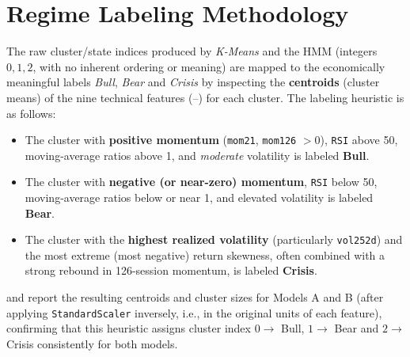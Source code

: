 \section{Regime Labeling Methodology}
\label{sec:meth-labeling}

The raw cluster/state indices produced by \textit{K-Means} and the HMM
(integers $0,1,2$, with no inherent ordering or meaning) are mapped to the
economically meaningful labels \emph{Bull}, \emph{Bear} and
\emph{Crisis} by inspecting the \textbf{centroids} (cluster means) of the
nine technical features (--) for each
cluster. The labeling heuristic is as follows:

\begin{itemize}
  \item The cluster with \textbf{positive momentum} (\texttt{mom21},
  \texttt{mom126} $> 0$), \texttt{RSI} above 50, moving-average ratios
  above 1, and \emph{moderate} volatility is labeled \textbf{Bull}.
  \item The cluster with \textbf{negative (or near-zero) momentum},
  \texttt{RSI} below 50, moving-average ratios below or near 1, and
  elevated volatility is labeled \textbf{Bear}.
  \item The cluster with the \textbf{highest realized volatility}
  (particularly \texttt{vol252d}) and the most extreme (most negative)
  return skewness, often combined with a strong rebound in 126-session
  momentum, is labeled \textbf{Crisis}.
\end{itemize}

 and  report the
resulting centroids and cluster sizes for Models A and B (after applying
\texttt{StandardScaler} inversely, i.e., in the original units of each
feature), confirming that this heuristic assigns cluster index $0 \to$
Bull, $1 \to$ Bear and $2 \to$ Crisis consistently for both models.

